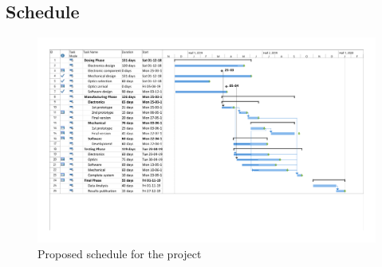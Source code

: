\begin{landscape}

\subsection{Schedule}
\begin{figure}[H]

\includegraphics[scale=0.65]{3-project-planning/img/Gantt1_15072019.pdf}
\caption{Proposed schedule for the project}
\label{GanttChart}
\end{figure}

\end{landscape}

